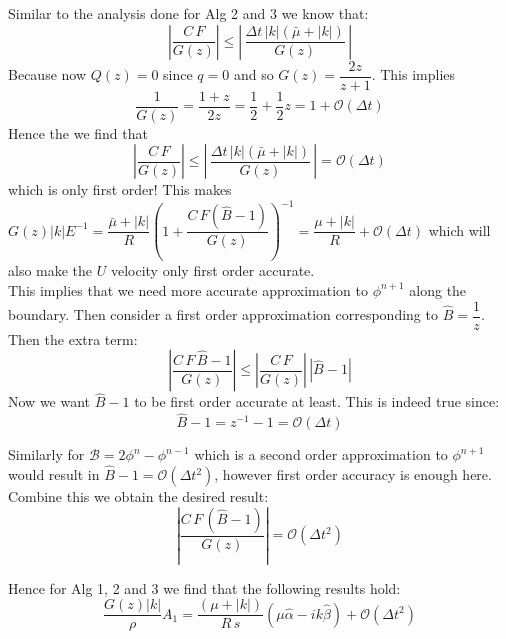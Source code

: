 Similar to the analysis done for Alg 2 and 3 we know that:
\begin{equation*}
\left|\dfrac{C\,F}{G(z)}\right| \leqslant |\,\dfrac{\Delta t \,|k|(\bar{\mu}+|k|)}{G(z)}\,|
\end{equation*}
Because now $Q(z) = 0$ since $q=0$ and so $G(z) = \dfrac{2z}{z+1}$. This implies 
\begin{equation*}
\dfrac{1}{G(z)} = \dfrac{1+z}{2z} = \dfrac{1}{2} + \dfrac{1}{2}z = 1 + \mathcal{O}(\Delta t)
\end{equation*} 
Hence the we find that
\begin{equation}
|\dfrac{C\,F}{G(z)}| \leqslant |\,\dfrac{\Delta t \,|k|(\bar{\mu}+|k|)}{G(z)}\,| = \mathcal{O}(\Delta t)
\end{equation}
which is only first order! This makes $G(z) |k|E^{-1} = \dfrac{\bar{\mu} + |k|}{R}(1 + \dfrac{C \, F(\hat{B} - 1)}{G(z)})^{-1} = \dfrac{\mu + |k|}{R} +\mathcal{O}(\Delta t)$ which will also make the $U$ velocity only first order accurate.\\

This implies that we need more accurate approximation to $\phi^{n+1}$ along the boundary. Then consider a first order approximation corresponding to $\hat{B}=\dfrac{1}{z}$.\\

Then the extra term:
\begin{equation*}
|\dfrac{C\,F\,\hat{B}-1}{G(z)}| \leqslant |\dfrac{C\,F}{G(z)}|\,|\hat{B}-1|
\end{equation*}
Now we want $\hat{B}-1$ to be first order accurate at least. This is indeed true since:
\begin{equation}
\hat{B} - 1 = z^{-1} - 1 = \mathcal{O}(\Delta t)
\end{equation}

Similarly for $\mathcal{B} = 2 \phi^n - \phi^{n-1}$ which is a second order approximation to $\phi^{n+1}$ would result in $\hat{B} - 1 = \mathcal{O} (\Delta t^2)$, however first order accuracy is enough here.\\

Combine this we obtain the desired result:
\begin{equation}
|\dfrac{C\,F\,(\hat{B}-1)}{G(z)}| = \mathcal{O}(\Delta t^2)
\end{equation}

Hence for Alg 1, 2 and 3 we find that the following results hold:
\begin{equation}
\dfrac{G(z) |k|}{\rho} A_1 = \dfrac{(\mu + |k|)}{R \, s} (\mu \hat{\alpha} - ik \hat{\beta}) + \mathcal{O} (\Delta t^2)
\end{equation}

